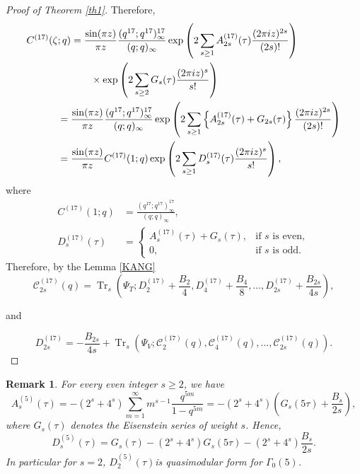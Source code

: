 \documentclass[12pt,oneside,reqno]{amsart}
\numberwithin{equation}{section}
\newtheorem{remark}[subsection]{Remark}
\begin{document}
\begin{proof}[Proof of Theorem \ref{th1}]
	Therefore,
	\begin{align}
		C^{(17)}(\zeta;q)
		&=
		\frac{\sin(\pi z)}{\pi z}
		\frac{(q^{17};q^{17})_{\infty}^{17}}
		{(q;q)_{\infty}}
		\exp\left(
		2\sum_{s\ge1}
		A^{(17)}_{2s}(\tau)
		\frac{(2\pi iz)^{2s}}{(2s)!}
		\right)
		\notag\\
		&\qquad\times
		\exp\left(
		2\sum_{s\ge2}
		G_s(\tau)
		\frac{(2\pi iz)^s}{s!}
		\right)
		\notag\\
		={}&
		\frac{\sin(\pi z)}{\pi z}
		\frac{(q^{17};q^{17})_{\infty}^{17}}
		{(q;q)_{\infty}}
		\exp\left(
		2\sum_{s\ge1}
		\left\{
		A^{(17)}_{2s}(\tau)+G_{2s}(\tau)
		\right\}
		\frac{(2\pi iz)^{2s}}{(2s)!}
		\right)
		\notag\\
		={}&
		\frac{\sin(\pi z)}{\pi z}
		C^{(17)}(1;q)
		\exp\left(
		2\sum_{s\ge1}
		D^{(17)}_{s}(\tau)
		\frac{(2\pi iz)^s}{s!}
		\right),
		\label{eq:17coreD}
	\end{align}
	where
	\begin{align*}
		C^{(17)}(1;q)
		&=
		\frac{(q^{17};q^{17})_{\infty}^{17}}
		{(q;q)_{\infty}},\\
		D^{(17)}_{s}(\tau)
		&=
		\begin{cases}
			A^{(17)}_{s}(\tau)+G_s(\tau), & \text{if } s \text{ is even},\\[6pt]
			0, & \text{if } s \text{ is odd}.
		\end{cases}
	\end{align*}
	Therefore, by the Lemma \eqref{KANG}
	\[
	\mathcal{C}_{2s}^{(17)}(q)
	=
	\operatorname{Tr}_s
	\left(
	\Psi_T;
	D^{(17)}_{2}+\frac{B_2}{4},
	D^{(17)}_{4}+\frac{B_4}{8},
	\ldots,
	D^{(17)}_{2s}+\frac{B_{2s}}{4s}
	\right),
	\]
	
	and
	
	\[
	D^{(17)}_{2s}
	=
	-\frac{B_{2s}}{4s}
	+
	\operatorname{Tr}_s
	\left(
	\Psi_V;
	\mathcal{C}_2^{(17)}(q),
	\mathcal{C}_4^{(17)}(q),
	\ldots,
	\mathcal{C}_{2s}^{(17)}(q)
	\right).
	\]
	
\end{proof}
\begin{remark}
	For every even integer $s\ge2$, we have
	\[
	A^{(5)}_s(\tau)
	=
	-\left(2^s+4^s\right)
	\sum_{m=1}^{\infty}
	m^{s-1}
	\frac{q^{5m}}{1-q^{5m}}
	=
	-\left(2^s+4^s\right)
	\left(
	G_s(5\tau)
	+\frac{B_s}{2s}
	\right),
	\]
	where $G_s(\tau)$ denotes the Eisenstein series of weight $s$. Hence,
	\[
	D^{(5)}_s(\tau)
	=
	G_s(\tau)
	-
	\left(2^s
	+4^s\right)
	G_s(5\tau)
	-
	\left(2^s+4^s\right)\frac{B_s}{2s}.\]
	In particular for $s=2$,	$D^{(5)}_2(\tau)$is quasimodular form for $\Gamma_0(5)$. 
\end{remark}
\end{document}
